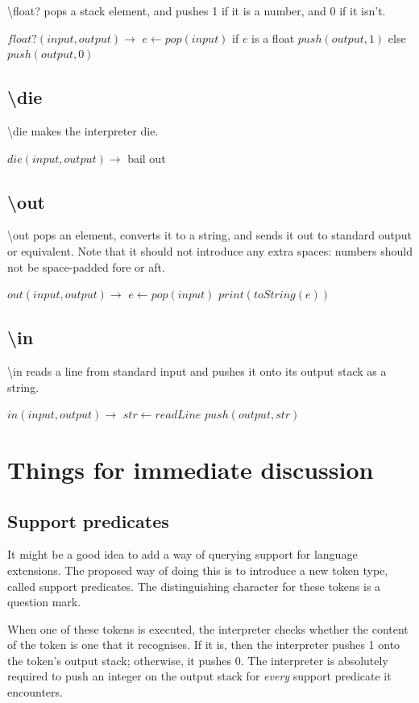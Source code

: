 \documentclass{article}
\let\bs\textbackslash
\def\pc{\bigskip\obeylines\parindent=0pt}
\begin{document}
{{{{{\bs float? pops a stack element, and pushes 1 if it is a number, and 0 if it isn't.

{\pc
$float?(input, output) \rightarrow$
\quad $e \leftarrow pop(input)$
\quad if $e$ is a float
\quad \quad $push(output, 1)$
\quad else
\quad \quad $push(output, 0)$
}

\subsection{\bs die}
\bs die makes the interpreter die.

{\pc
$die(input, output) \rightarrow$
\quad bail out
}

\subsection {\bs out}

\bs out pops an element, converts it to a string, and sends it out to standard output or equivalent.  Note that it should not introduce any extra spaces: numbers should not be space-padded fore or aft.

{\pc
$out(input,output) \rightarrow$
\quad $e \leftarrow pop(input)$
\quad $print(toString(e))$
}

\subsection{\bs in}

\bs in reads a line from standard input and pushes it onto its output stack as a string.

{\pc
$in(input, output) \rightarrow$
\quad $str \leftarrow readLine$
\quad $push(output, str)$
}


\section{Things for immediate discussion}

\subsection{Support predicates}

It might be a good idea to add a way of querying support for language extensions.  The proposed way of doing this is to introduce a new token type, called support predicates.  The distinguishing character for these tokens is a question mark.

When one of these tokens is executed, the interpreter checks whether the content of the token is one that it recognises.  If it is, then the interpreter pushes 1 onto the token's output stack; otherwise, it pushes 0.  The interpreter is absolutely required to push an integer on the output stack for \emph{every} support predicate it encounters.

}}}}}
\end{document}
